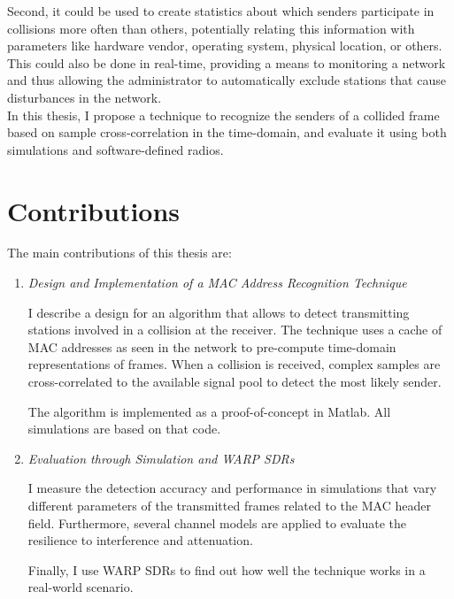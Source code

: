 Second, it could be used to create statistics about which senders participate in collisions more often than others, potentially relating this information with parameters like hardware vendor, operating system, physical location, or others. This could also be done in real-time, providing a means to monitoring a network and thus allowing the administrator to automatically exclude stations that cause disturbances in the network.\\

In this thesis, I propose a technique to recognize the senders of a collided frame based on sample cross-correlation in the time-domain, and evaluate it using both simulations and software-defined radios.

\clearpage



\section{Contributions}

The main contributions of this thesis are:

\begin{enumerate}
	\item \textit{Design and Implementation of a MAC Address Recognition Technique}

	I describe a design for an algorithm that allows to detect transmitting stations involved in a collision at the receiver. The technique uses a cache of \gls{MAC} addresses as seen in the network to pre-compute time-domain representations of frames. When a collision is received, complex samples are cross-correlated to the available signal pool to detect the most likely sender.

	The algorithm is implemented as a proof-of-concept in Matlab. All simulations are based on that code.

	\item \textit{Evaluation through Simulation and WARP SDRs}

	I measure the detection accuracy and performance in simulations that vary different parameters of the transmitted frames related to the \gls{MAC} header field. Furthermore, several channel models are applied to evaluate the resilience to interference and attenuation.

	Finally, I use \gls{WARP} \glspl{SDR} to find out how well the technique works in a real-world scenario.
\end{enumerate}


